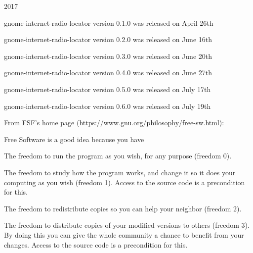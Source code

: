 \documentclass[20pt,landscape]{foils}
\begin{document}
\begin{list1}
\item 2017
  \begin{list2}  
  \item gnome-internet-radio-locator version 0.1.0 was released on April 26th
  \end{list2}
  \begin{list2}
  \item gnome-internet-radio-locator version 0.2.0 was released on June 16th
  \end{list2}    
  \begin{list2}
  \item gnome-internet-radio-locator version 0.3.0 was released on June 20th
  \end{list2}
  \begin{list2}
  \item gnome-internet-radio-locator version 0.4.0 was released on June 27th
  \end{list2}
  \begin{list2}
  \item gnome-internet-radio-locator version 0.5.0 was released on July 17th
  \end{list2}
  \begin{list2}
  \item gnome-internet-radio-locator version 0.6.0 was released on July 19th
  \end{list2}
\end{list1}


From FSF's home page (\url{https://www.gnu.org/philosophy/free-sw.html}):

\begin{list1}
\item Free Software is a good idea because you have
  \begin{list2}
    \item The freedom to run the program as you wish, for any purpose (freedom 0).
    \item The freedom to study how the program works, and change it so it does your computing as you wish (freedom 1). Access to the source code is a precondition for this.
    \item The freedom to redistribute copies so you can help your neighbor (freedom 2).
    \item The freedom to distribute copies of your modified versions to others (freedom 3). By doing this you can give the whole community a chance to benefit from your changes. Access to the source code is a precondition for this.
  \end{list2}
\end{list1}
\end{document}
